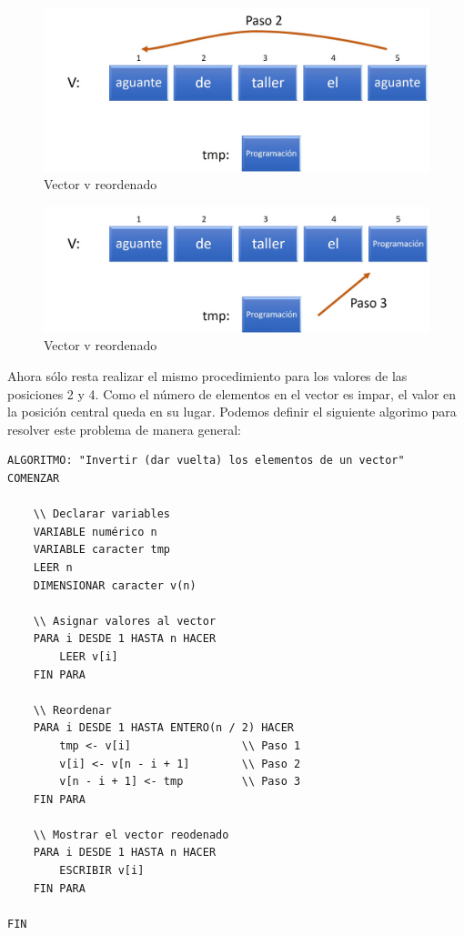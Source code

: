 \documentclass[]{book}
\begin{document}
\begin{figure}

{\centering \includegraphics[width=0.8\linewidth]{images/17_invertir} 

}

\caption{Vector v reordenado}\label{fig:inv4}
\end{figure}

\begin{figure}

{\centering \includegraphics[width=0.8\linewidth]{images/18_invertir} 

}

\caption{Vector v reordenado}\label{fig:inv5}
\end{figure}

Ahora sólo resta realizar el mismo procedimiento para los valores de las posiciones 2 y 4. Como el número de elementos en el vector es impar, el valor en la posición central queda en su lugar. Podemos definir el siguiente algorimo para resolver este problema de manera general:

\begin{verbatim}
ALGORITMO: "Invertir (dar vuelta) los elementos de un vector"
COMENZAR
    
    \\ Declarar variables
    VARIABLE numérico n
    VARIABLE caracter tmp
    LEER n
    DIMENSIONAR caracter v(n)
    
    \\ Asignar valores al vector
    PARA i DESDE 1 HASTA n HACER
        LEER v[i]
    FIN PARA
    
    \\ Reordenar
    PARA i DESDE 1 HASTA ENTERO(n / 2) HACER
        tmp <- v[i]                 \\ Paso 1
        v[i] <- v[n - i + 1]        \\ Paso 2
        v[n - i + 1] <- tmp         \\ Paso 3
    FIN PARA
    
    \\ Mostrar el vector reodenado
    PARA i DESDE 1 HASTA n HACER
        ESCRIBIR v[i]
    FIN PARA
    
FIN
\end{verbatim}
\end{document}
